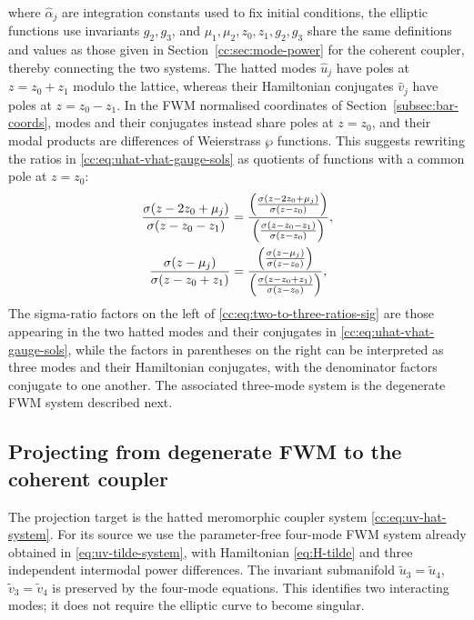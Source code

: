 \documentclass[11pt,a4paper]{article}
\numberwithin{equation}{section}
\begin{document}
where $\hat{\alpha}_{j}$ are integration constants used to fix initial conditions, the elliptic functions use invariants $g_2, g_3$, and $\mu_1, \mu_2, z_0, z_1, g_2, g_3$ share the same definitions and values as those given in Section~\ref{cc:sec:mode-power} for the coherent coupler, thereby connecting the two systems. 
The hatted modes $\hat{u}_j$ have poles at $z=z_0+z_1$ modulo the lattice, whereas their Hamiltonian conjugates $\hat{v}_j$ have poles at $z=z_0-z_1$. 
In the FWM normalised coordinates of Section~\ref{subsec:bar-coords}, modes and their conjugates instead share poles at $z=z_0$, and their modal products are differences of Weierstrass $\wp$ functions. 
This suggests rewriting the ratios in \eqref{cc:eq:uhat-vhat-gauge-sols} as quotients of functions with a common pole at $z=z_0$:
\begin{align}
  \frac{ \sigma{\left(z - 2 z_{0} + {\mu}_{j}\right)} }{\sigma{\left(z - z_{0} - z_{1}\right)}} &= \frac{\left(\frac{\sigma{\left(z - 2 z_{0} + {\mu}_{j}\right)}}{\sigma{\left(z - z_{0}\right)}}\right)}{\left(\frac{\sigma{\left(z - z_{0} - z_{1}\right)}}{\sigma{\left(z - z_{0}\right)}}\right)}, \notag \\
  \frac{ \sigma{\left(z - {\mu}_{j}\right)} }{\sigma{\left(z - z_{0} + z_{1}\right)}} &= \frac{\left(\frac{\sigma{\left(z - {\mu}_{j}\right)}}{\sigma{\left(z - z_{0}\right)}}\right)}{\left(\frac{\sigma{\left(z - z_{0} + z_{1}\right)}}{\sigma{\left(z - z_{0}\right)}}\right)}, \label{cc:eq:two-to-three-ratios-sig}
\end{align}
The sigma-ratio factors on the left of \eqref{cc:eq:two-to-three-ratios-sig} are those appearing in the two hatted modes and their conjugates in \eqref{cc:eq:uhat-vhat-gauge-sols}, while the factors in parentheses on the right can be interpreted as three modes and their Hamiltonian conjugates, with the denominator factors conjugate to one another.
The associated three-mode system is the degenerate FWM system described next.

\subsection{Projecting from degenerate FWM to the coherent coupler}\label{cc:subsec:deg-fwm}
The projection target is the hatted meromorphic coupler system \eqref{cc:eq:uv-hat-system}.
For its source we use the parameter-free four-mode FWM system already obtained in \eqref{eq:uv-tilde-system}, with Hamiltonian \eqref{eq:H-tilde} and three independent intermodal power differences.
The invariant submanifold $\tilde u_3=\tilde u_4$, $\tilde v_3=\tilde v_4$ is preserved by the four-mode equations.
This identifies two interacting modes; it does not require the elliptic curve to become singular.
\end{document}
